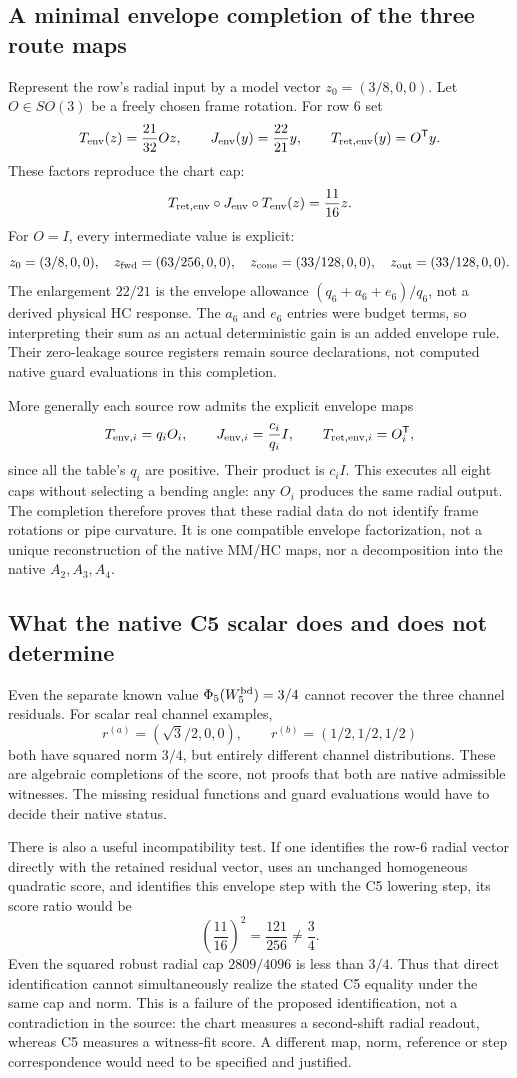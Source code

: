 \documentclass[11pt,a4paper]{article}
\begin{document}
\subsection{A minimal envelope completion of the three route maps}
Represent the row's radial input by a model vector $z_0=(3/8,0,0)$.
Let $O\in SO(3)$ be a freely chosen frame rotation. For row 6 set
\[
T_{\rm env}(z)=\frac{21}{32}Oz,
\qquad J_{\rm env}(y)=\frac{22}{21}y,
\qquad T_{\rm ret,env}(y)=O^{\mathsf T}y.
\]
These factors reproduce the chart cap:
\[
T_{\rm ret,env}\circ J_{\rm env}\circ T_{\rm env}(z)
=\frac{11}{16}z.
\]
For $O=I$, every intermediate value is explicit:
\[
z_0=(3/8,0,0),\quad
z_{\rm fwd}=(63/256,0,0),\quad
z_{\rm cone}=(33/128,0,0),\quad
z_{\rm out}=(33/128,0,0).
\]
The enlargement $22/21$ is the envelope allowance
$(q_6+a_6+e_6)/q_6$, not a derived physical HC response.
The $a_6$ and $e_6$ entries were budget terms, so interpreting their
sum as an actual deterministic gain is an added envelope rule.
Their zero-leakage source registers remain source declarations, not
computed native guard evaluations in this completion.

More generally each source row admits the explicit envelope maps
\[
T_{{\rm env},i}=q_iO_i,\qquad
J_{{\rm env},i}=\frac{c_i}{q_i}I,\qquad
T_{{\rm ret,env},i}=O_i^{\mathsf T},
\]
since all the table's $q_i$ are positive. Their product is $c_iI$.
This executes all eight caps without selecting a bending angle: any
$O_i$ produces the same radial output. The completion therefore proves
that these radial data do not identify frame rotations or pipe curvature.
It is one compatible envelope factorization, not a unique reconstruction
of the native MM/HC maps, nor a decomposition into the native $A_2,A_3,A_4$.

\subsection{What the native C5 scalar does and does not determine}
Even the separate known value $\Phi_5(W_5^{\rm bd})=3/4$ cannot recover
the three channel residuals. For scalar real channel examples,
\[
r^{(a)}=(\sqrt3/2,0,0),\qquad r^{(b)}=(1/2,1/2,1/2)
\]
both have squared norm $3/4$, but entirely different channel distributions.
These are algebraic completions of the score, not proofs that both are
native admissible witnesses. The missing residual functions and guard
evaluations would have to decide their native status.

There is also a useful incompatibility test. If one identifies the row-6
radial vector directly with the retained residual vector, uses an unchanged
homogeneous quadratic score, and identifies this envelope step with the
C5 lowering step, its score ratio would be
\[
\left(\frac{11}{16}\right)^2=\frac{121}{256}
\ne\frac34.
\]
Even the squared robust radial cap $2809/4096$ is less than $3/4$.
Thus that direct identification cannot simultaneously realize the stated
C5 equality under the same cap and norm. This is a failure of the proposed
identification, not a contradiction in the source: the chart measures a
second-shift radial readout, whereas C5 measures a witness-fit score.
A different map, norm, reference or step correspondence would need to be
specified and justified.
\end{document}
